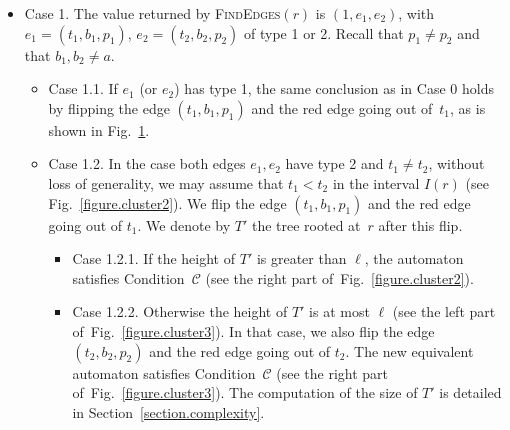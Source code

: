 \documentclass[11pt,a4paper]{article}
\def\C{\mathscr{C}}
\def\T{{T}}
\newcommand{\ie}{{\itshape i.e.}\xspace }
\begin{document}
\begin{itemize}
\begin{figure}[htbp]
{\begin{VCPicture}{(0,-1)(12,13)}
{{    
    \RstStateFillColor
}
}
\end{VCPicture}}
        \caption{The picture on the left illustrates Case 1.1.
          The edge $(t_1,b_1,p_1)$ if of type 1. After flipping the
          edge $(t_1,b_1,p_1)$ and the red edge going out of $t_1$, we
          get the automaton on the right. It satisfies the
          Condition~$\C$, \ie it has a unique maximal tree (here
          rooted at $r$). Maximal states are colored and the (dashed)
          $b$-edges of the automaton are not all
          represented.}\label{figure.cluster1}
\end{figure}
\item Case 1. The value returned by \textsc{FindEdges}$(r)$ is
$(1,e_1,e_2)$, with $e_1=(t_1,b_1,p_1)$, $e_2=(t_2,b_2,p_2)$ of
type 1 or 2. Recall that $p_1 \neq p_2$ and that $b_1,b_2 \neq a$.
\begin{itemize}
\item Case 1.1. If $e_1$ (or $e_2$) has type 1, the same
conclusion as in Case 0 holds by flipping the edge $(t_1,b_1,p_1)$ and the red edge
going out of~$t_1$, as is shown in Fig.~\ref{figure.cluster1}.
\item Case 1.2. In the case both edges $e_1,e_2$ have type 2 and $t_1
  \neq t_2$, without loss of generality, we may assume that $t_1 <
  t_2$ in the interval $I(r)$ (see Fig.~\ref{figure.cluster2}).  We
      flip the edge $(t_1,b_1,p_1)$ and the red edge going out of
      $t_1$.  We denote by $\T'$ the tree rooted at~$r$ after this
      flip.
\begin{itemize}
\item Case 1.2.1.
If the height of $\T'$
    is greater than $\ell$, the automaton satisfies Condition~$\C$ (see
    the right part of~Fig.~\ref{figure.cluster2}). 
\item Case 1.2.2.  Otherwise the height of $\T'$ is at most $\ell$
  (see the left part of~Fig.~\ref{figure.cluster3}).  In that case,
  we also flip the edge $(t_2,b_2,p_2)$ and the red edge going out of
  $t_2$. The new equivalent automaton satisfies Condition~$\C$ (see
  the right part of~Fig.~\ref{figure.cluster3}).  The computation of
  the size of $\T'$ is detailed in Section~\ref{section.complexity}.
\end{itemize}


\end{itemize}
\end{itemize}
\end{document}
